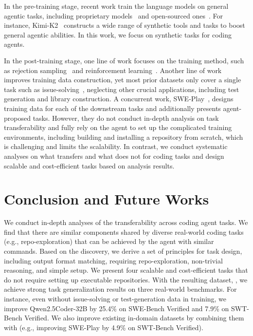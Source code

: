 \documentclass{article}
\theoremstyle{plain}
\theoremstyle{definition}
\theoremstyle{remark}
\begin{document}
In the pre-training stage, recent work train the language models on general agentic tasks, including proprietary models~\cite{gpt5,claude45} and open-sourced ones~\cite{qwen3,deepseekv3}.
For instance, Kimi-K2~\cite{kimik2} constructs a wide range of synthetic tools and tasks to boost general agentic abilities.
In this work, we focus on synthetic tasks for coding agents.

In the post-training stage, one line of work focuses on the training method, such as rejection sampling~\cite{swegym} and reinforcement learning~\cite{swerl,rlcoder,mlagent}.
Another line of work improves training data construction, yet most prior datasets only cover a single task such as issue-solving~\cite{swegym,swefixer,swegpt,R2EGym,swe-smith}, neglecting other crucial applications, including test generation and library construction.
A concurrent work, SWE-Play~\cite{swe-play}, designs training data for each of the downstream tasks and additionally presents agent-proposed tasks. 
However, they do not conduct in-depth analysis on task transferability and fully rely on the agent to set up the complicated training environments, including building and installing a repository from scratch, which is challenging and limits the scalability.
In contrast, we conduct systematic analyses on what transfers and what does not for coding tasks and design scalable and cost-efficient tasks based on analysis results.



\section{Conclusion and Future Works}
We conduct in-depth analyses of the transferability across coding agent tasks.
We find that there are similar components shared by diverse real-world coding tasks (e.g., repo-exploration) that can be achieved by the agent with similar commands.
Based on the discovery, we derive a set of principles for task design, including output format matching, requiring repo-exploration, non-trivial reasoning, and simple setup.
We present four scalable and cost-efficient tasks that do not require setting up executable repositories.
With the resulting dataset, \methodName, we achieve strong task generalization results on three real-world benchmarks. For instance, even without issue-solving or test-generation data in training, we improve Qwen2.5Coder-32B by 25.4\% on SWE-Bench Verified and 7.9\% on SWT-Bench Verified.
We also improve existing in-domain datasets by combining them with \methodName (e.g., improving SWE-Play by 4.9\% on SWT-Bench Verified).
\end{document}
